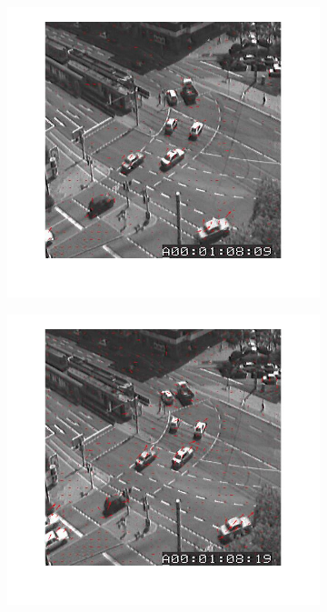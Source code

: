 \documentclass[a4paper]{iacas}
\begin{document}
\begin{figure}[!htbp]
	\centering
	\begin{subfigure}[b]{0.4\textwidth}
		\includegraphics[width=\textwidth]{102.jpg}
		\caption{}
		\label{fig:102}
	\end{subfigure}
	\begin{subfigure}[b]{0.4\textwidth}
		\includegraphics[width=\textwidth]{103.jpg}
		\caption{}
		\label{fig:103}
	\end{subfigure}


\end{figure}
\end{document}
